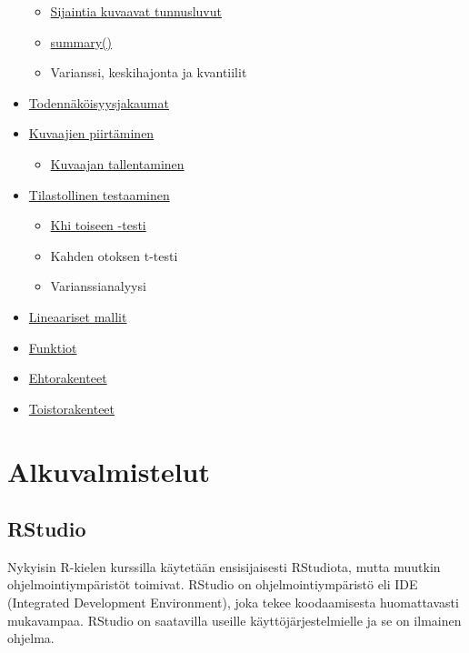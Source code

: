 \documentclass[
]{book}
\providecommand{\tightlist}{%
  \setlength{\itemsep}{0pt}\setlength{\parskip}{0pt}}
\begin{document}
\begin{itemize}
  \begin{itemize}
  \tightlist
  \item
    \protect\hyperlink{sijaintia-kuvaavat-tunnusluvut}{Sijaintia kuvaavat tunnusluvut}
  \item
    \protect\hyperlink{summary}{summary()}
  \item
    Varianssi, keskihajonta ja kvantiilit
  \end{itemize}
\item
  \protect\hyperlink{distributions}{Todennäköisyysjakaumat}
\item
  \protect\hyperlink{plotting}{Kuvaajien piirtäminen}

  \begin{itemize}
  \tightlist
  \item
    \protect\hyperlink{kuvaajan-tallentaminen}{Kuvaajan tallentaminen}
  \end{itemize}
\item
  \protect\hyperlink{tests}{Tilastollinen testaaminen}

  \begin{itemize}
  \tightlist
  \item
    \protect\hyperlink{chi-squared-test}{Khi toiseen -testi}
  \item
    Kahden otoksen t-testi
  \item
    Varianssianalyysi
  \end{itemize}
\item
  \protect\hyperlink{linear_models}{Lineaariset mallit}
\item
  \protect\hyperlink{functions}{Funktiot}
\item
  \protect\hyperlink{ifelse}{Ehtorakenteet}
\item
  \protect\hyperlink{loops}{Toistorakenteet}
\end{itemize}

\hypertarget{alkuvalmistelut}{%
\chapter*{Alkuvalmistelut}\label{alkuvalmistelut}}

\hypertarget{rstudio}{%
\section*{RStudio}\label{rstudio}}

Nykyisin R-kielen kurssilla käytetään ensisijaisesti RStudiota, mutta muutkin ohjelmointiympäristöt toimivat. RStudio on ohjelmointiympäristö eli IDE (Integrated Development Environment), joka tekee koodaamisesta huomattavasti mukavampaa. RStudio on saatavilla useille käyttöjärjestelmielle ja se on ilmainen ohjelma.
\end{document}
